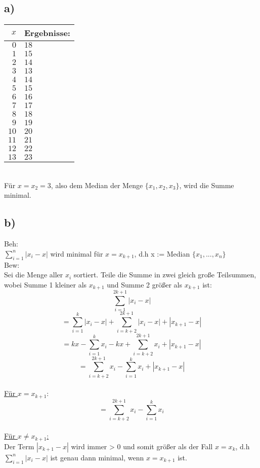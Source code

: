 \documentclass[a4paper,11pt,twoside]{article}
\begin{document}
\subsection*{a)}
\begin{tabular}{r|l}
	$x$ & Ergebnisse: \\ \hline
	$0$&$18$\\
	$1$&$15$\\
	$2$&$14$\\
	$3$&$13$\\
	$4$&$14$\\
	$5$&$15$\\
	$6$&$16$\\
	$7$&$17$\\
	$8$&$18$\\
	$9$&$19$\\
	$10$&$20$\\
	$11$&$21$\\
	$12$&$22$\\
	$13$&$23$
\end{tabular} \\

Für $x=x_2=3$, also dem Median der Menge $\{x_1, x_2, x_3\}$, wird die Summe minimal.

\pagebreak

\subsection*{b)}

Beh:\\ $\sum_{i=1}^{n} |x_i-x|$ wird minimal für $x = x_{k+1}$, d.h x := Median $\{x_1, ..., x_n\}$\\

Bew: \\
Sei die Menge aller $x_i$ sortiert. Teile die Summe in zwei gleich große Teilsummen, wobei Summe 1 kleiner als $x_{k+1}$ und Summe 2 größer als $x_{k+1} $ ist:
\[\sum_{i=1}^{2k+1}|x_i-x|\]
\[= \sum_{i=1}^{k}|x_i-x| + \sum_{i=k+2}^{2k+1}|x_i-x| + |x_{k+1}-x|\]
\[= kx - \sum_{i=1}^{k}x_i -kx+ \sum_{i=k+2}^{2k+1}x_i + |x_{k+1}-x|\]
\[= \sum_{i=k+2}^{2k+1}x_i - \sum_{i=1}^{k}x_i + |x_{k+1}-x|\]\\

\underline{Für $x=x_{k+1}$}:
\[= \sum_{i=k+2}^{2k+1}x_i - \sum_{i=1}^{k}x_i \] \\

\underline{Für $x \neq x_{k+1}$:}\\
Der Term  $|x_{k+1}-x|$ wird immer > 0 und somit größer als der Fall $x=x_k$, d.h  $\sum_{i=1}^{n} |x_i-x|$ ist genau dann minimal, wenn $x = x_{k+1}$ ist.
\end{document}
